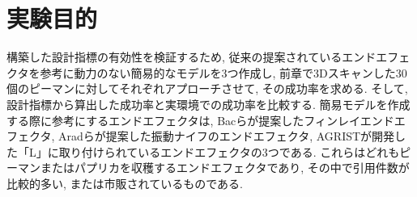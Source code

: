 \section{実験目的}
構築した設計指標の有効性を検証するため, 従来の提案されているエンドエフェクタを参考に動力のない簡易的なモデルを3つ作成し, 前章で3Dスキャンした30個のピーマンに対してそれぞれアプローチさせて, その成功率を求める.
そして, 設計指標から算出した成功率と実環境での成功率を比較する.
簡易モデルを作成する際に参考にするエンドエフェクタは, Bacらが提案したフィンレイエンドエフェクタ, Aradらが提案した振動ナイフのエンドエフェクタ, AGRISTが開発した「L」に取り付けられているエンドエフェクタの3つである.
これらはどれもピーマンまたはパプリカを収穫するエンドエフェクタであり, その中で引用件数が比較的多い, または市販されているものである.
